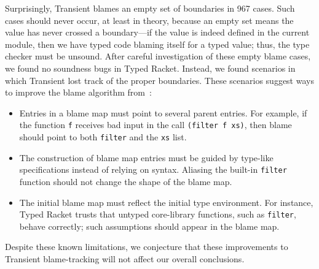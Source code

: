 Surprisingly, Transient blames an empty set of boundaries in 967 cases.
Such cases should never occur, at least in theory, because an empty set
 means the value has never crossed a boundary---if the value is indeed defined
 in the current module, then we have typed code blaming itself for a typed
 value; thus, the type checker must be unsound.
After careful investigation of these empty blame cases, we found no soundness
 bugs in Typed Racket.
Instead, we found scenarios in which Transient lost track of the proper
 boundaries.
These scenarios suggest ways to improve the blame algorithm from~\citet{vss-popl-2017}:
\begin{itemize}
  \item
    Entries in a blame map must point to several parent entries.
    For example, if the function \texttt{f} receives bad input in the call
    \texttt{(filter f xs)}, then blame should point to both \texttt{filter}
    and the \texttt{xs} list.
  \item
    The construction of blame map entries must be guided by type-like specifications
     instead of relying on syntax.
    Aliasing the built-in \texttt{filter} function should not change the shape
     of the blame map.
  \item
    The initial blame map must reflect the initial type environment.
    For instance, Typed Racket trusts that untyped core-library functions, such as \texttt{filter},
     behave correctly; such assumptions should appear in the blame map.
\end{itemize}
\noindent{}Despite these known limitations, we conjecture that these improvements
 to Transient blame-tracking will not affect our overall conclusions.


